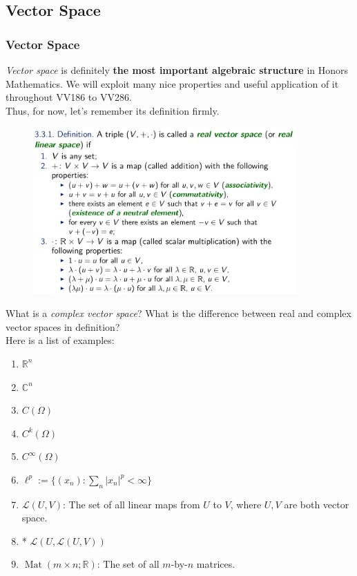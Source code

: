 \documentclass[10pt, t]{beamer}
\renewcommand{\emph}[1]{{\color{themecolor}\textsl{#1}}}
\newcommand{\R}{\mathbb{R}}
\newcommand{\nullspace}{~\\[15pt]}
\begin{document}
\subsection{Vector Space}
\begin{frame}[allowframebreaks]
    \frametitle{Vector Space}
    \emph{Vector space} is definitely \textbf{the most important algebraic structure} in Honors Mathematics. We will exploit many nice properties and useful application of it throughout VV186 to VV286.
    \nullspace
    Thus, for now, let's remember its definition firmly.
    \begin{figure}[H]
        \centering
        \includegraphics[width=0.9\textwidth]{2020-11-04-15-49-39.png}
    \end{figure}
    What is a \emph{complex vector space}? What is the difference between real and complex vector spaces in definition?\nullspace
    Here is a list of examples:
    \begin{enumerate}
        \item $\R^n$
        \item $\mathbb{C}^n$
        \item $C(\Omega)$
        \item $C^k(\Omega)$
        \item $C^\infty(\Omega)$
        \item $\ell^p:=\{(x_n):\sum_{n}\left|x_{n}\right|^{p}<\infty\}$
        \item $\mathcal{L}(U,V)$: The set of all linear maps from $U$ to $V$, where $U,V$ are both vector space.
        \item* $\mathcal{L}(U,\mathcal{L}(U,V))$
        \item $\operatorname{Mat}(m\times n;\R)$: The set of all $m$-by-$n$ matrices.
    \end{enumerate}
\end{frame}
\end{document}
